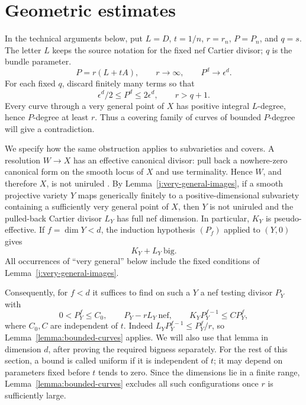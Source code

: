 \documentclass[12pt,a4paper,psamsfonts]{amsart}
\theoremstyle{definition}
\theoremstyle{plain}
\begin{document}
\section{Geometric estimates}\label{sec:geometry}
In the technical arguments below, put $L=D$, $t=1/n$, $r=r_n$,
$P=P_n$, and $q=s$. The letter $L$ keeps the source notation for
the fixed nef Cartier divisor; $q$ is the bundle parameter.
\begin{equation}\label{eq:scaling}
 P=r(L+tA),\qquad r\to\infty,\qquad P^d\to\epsilon^d.
\end{equation}
For each fixed $q$, discard finitely many terms so that
\begin{equation}\label{j:volume-window}
 \epsilon^d/2\le P^d\le2\epsilon^d,\qquad r>q+1.
\end{equation}
Every curve through a very general point of $X$ has positive integral
$L$-degree, hence $P$-degree at least $r$. Thus a covering family of
curves of bounded $P$-degree will give a contradiction.

We specify how the same obstruction applies to subvarieties and
covers. A resolution $W\to X$ has an effective canonical divisor:
pull back a nowhere-zero canonical form on the smooth locus of $X$
and use terminality. Hence $W$, and therefore $X$, is not uniruled
\cite{BDPP}. By Lemma~\ref{j:very-general-images}, if a smooth
projective variety $Y$ maps generically finitely to a
positive-dimensional subvariety containing a sufficiently very general
point of $X$, then $Y$ is not uniruled and the pulled-back Cartier
divisor $L_Y$ has full nef dimension. In particular, $K_Y$ is
pseudo-effective. If $f=\dim Y<d$, the induction hypothesis $(P_f)$
applied to $(Y,0)$ gives
\begin{equation}\label{j:lower-big}
                         K_Y+L_Y\ \text{big}.
\end{equation}
All occurrences of ``very general'' below include the fixed
conditions of Lemma~\ref{j:very-general-images}.

Consequently, for $f<d$ it suffices to find on such a $Y$ a nef
testing divisor $P_Y$ with
\[
 0<P_Y^f\le C_0,\qquad P_Y-rL_Y\ \text{nef},\qquad
 K_YP_Y^{f-1}\le C P_Y^f,
\]
where $C_0,C$ are independent of $t$. Indeed
$L_YP_Y^{f-1}\le P_Y^f/r$, so Lemma~\ref{lemma:bounded-curves}
applies. We will also use that lemma in dimension $d$, after proving
the required bigness separately. For the rest of this section, a
bound is called uniform if it is independent of $t$; it may depend
on parameters fixed before $t$ tends to zero. Since the dimensions
lie in a finite range, Lemma~\ref{lemma:bounded-curves} excludes all
such configurations once $r$ is sufficiently large.
\end{document}
